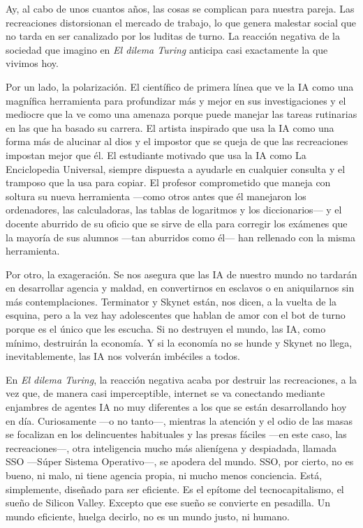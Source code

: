 \documentclass[11pt,a4paper]{article}
\begin{document}
Ay, al cabo de unos cuantos años, las cosas se complican para nuestra pareja. Las recreaciones distorsionan el mercado de trabajo, lo que genera malestar social que no tarda en ser canalizado por los luditas de turno. La reacción negativa de la sociedad que imagino en \emph{El dilema Turing} anticipa casi exactamente la que vivimos hoy. 

Por un lado, la polarización. El científico de primera línea que ve la IA como una magnífica herramienta para profundizar más y mejor en sus investigaciones y el mediocre que la ve como una amenaza porque puede manejar las tareas rutinarias en las que ha basado su carrera. El artista inspirado que usa la IA como una forma más de alucinar al dios y el impostor que se queja de que las recreaciones impostan mejor que él. El estudiante motivado que usa la IA como La Enciclopedia Universal, siempre dispuesta a ayudarle en cualquier consulta y el tramposo que la usa para copiar. El profesor comprometido que maneja con soltura su nueva herramienta ---como otros antes que él manejaron los ordenadores, las calculadoras, las tablas de logaritmos y los diccionarios--- y el docente aburrido de su oficio que se sirve de ella para corregir los exámenes que la mayoría de sus alumnos ---tan aburridos como él--- han rellenado con la misma herramienta. 

Por otro, la exageración. Se nos asegura que las IA de nuestro mundo no tardarán en desarrollar agencia y maldad, en convertirnos en esclavos o en aniquilarnos sin más contemplaciones. Terminator y Skynet están, nos dicen, a la vuelta de la esquina, pero a la vez hay adolescentes que hablan de amor con el bot de turno porque es el único que les escucha. Si no destruyen el mundo, las IA, como mínimo, destruirán la economía. Y si la economía no se hunde y Skynet no llega, inevitablemente, las IA nos volverán imbéciles a todos.

En \emph{El dilema Turing}, la reacción negativa acaba por destruir las recreaciones, a la vez que, de manera casi imperceptible, internet se va conectando mediante enjambres de agentes IA no muy diferentes a los que se están desarrollando hoy en día. Curiosamente ---o no tanto---, mientras la atención y el odio de las masas se focalizan en los delincuentes habituales y las presas fáciles ---en este caso, las recreaciones---, otra inteligencia mucho más alienígena y despiadada, llamada SSO ---Súper Sistema Operativo---, se apodera del mundo. SSO, por cierto, no es bueno, ni malo, ni tiene agencia propia, ni mucho menos conciencia. Está, simplemente, diseñado para ser eficiente. Es el epítome del tecnocapitalismo, el sueño de Silicon Valley. Excepto que ese sueño se convierte en pesadilla. Un mundo eficiente, huelga decirlo, no es un mundo justo, ni humano. 
\end{document}
